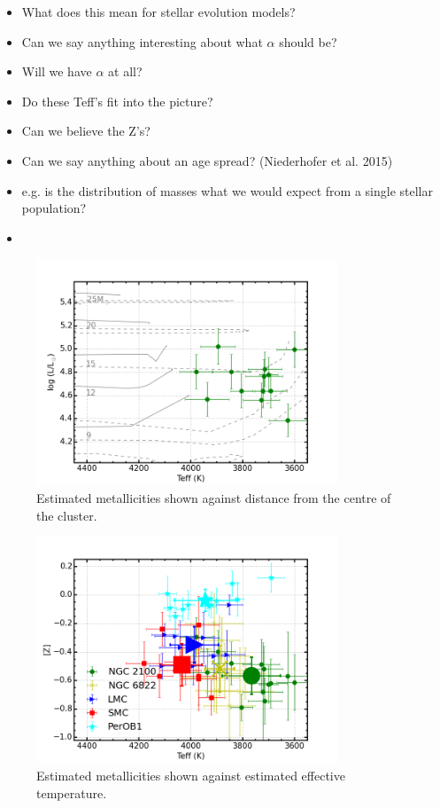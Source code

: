 \documentclass[useAMS,usenatbib]{mn2e}
\begin{document}
\begin{itemize}
  \item What does this mean for stellar evolution models?
  \item Can we say anything interesting about what $\alpha$ should be?
  \item Will we have $\alpha$ at all?
  \item Do these Teff's fit into the picture?
  \item Can we believe the Z's?
  \item Can we say anything about an age spread? (Niederhofer et al. 2015)
  \item e.g. is the distribution of masses what we would expect from a single stellar population?
  \item
\end{itemize}

\begin{figure}
 \includegraphics[width=9.0cm]{NGC2100-HRD}
 \caption{Estimated metallicities shown against distance from the centre of the cluster.
\label{fig:HRD}
          }
\end{figure}

\begin{figure}
 \includegraphics[width=9.0cm]{NGC2100-TeffvsZ}
 \caption{Estimated metallicities shown against estimated effective temperature.
\label{fig:TeffvsZ}
          }
\end{figure}
\end{document}

